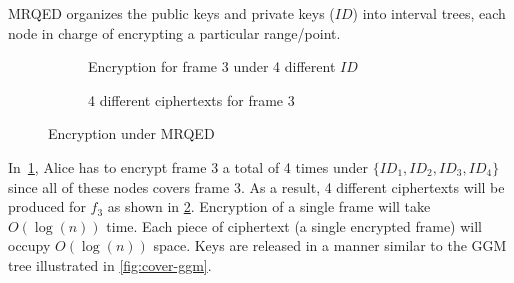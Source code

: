 \documentclass[hyp,a4paper,12pt,openbib]{socreport}
\begin{document}
MRQED organizes the public keys and private keys ($ID$) into interval trees, each node in charge of encrypting a particular range/point.


\begin{figure}[h]
 \begin{subfigure}{.63\textwidth}
 \centering
{}
\caption{Encryption for frame $3$ under 4 different $ID$}
\label{fig:mrqed-encrypt}
\end{subfigure} \begin{subfigure}{.33\textwidth}
\caption{4 different ciphertexts for frame $3$}
\label{fig:mrqed-ciphertext}
\end{subfigure}

\caption{Encryption under MRQED}
\label{fig:mrqed}
\end{figure}%



In~\cref{fig:mrqed-encrypt}, Alice has to encrypt frame $3$ a total of 4 times under $\{ID_1, ID_2, ID_3, ID_4\}$ since all of these nodes covers frame $3$. As a result, 4 different ciphertexts will be produced for $f_3$ as shown in \cref{fig:mrqed-ciphertext}. Encryption of a single frame will take $O(\log(n))$ time. Each piece of ciphertext (a single encrypted frame) will occupy $O(\log(n))$ space. Keys are released in a manner similar to the GGM tree illustrated in \cref{fig:cover-ggm}. 

%
\end{document}
